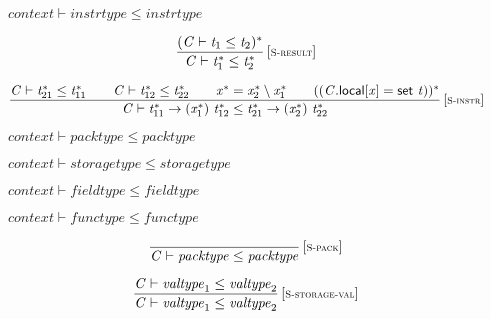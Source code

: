 $\boxed{{\mathit{context}} \vdash {\mathit{instrtype}} \leq {\mathit{instrtype}}}$

$$
\begin{array}{@{}c@{}}\displaystyle
\frac{
({\mathit{C}} \vdash {\mathit{t}}_{{1}} \leq {\mathit{t}}_{{2}})^\ast
}{
{\mathit{C}} \vdash {{\mathit{t}}_{{1}}^\ast} \leq {{\mathit{t}}_{{2}}^\ast}
} \, {[\textsc{\scriptsize S{-}result}]}
\qquad
\end{array}
$$

$$
\begin{array}{@{}c@{}}\displaystyle
\frac{
{\mathit{C}} \vdash {{\mathit{t}}_{{21}}^\ast} \leq {{\mathit{t}}_{{11}}^\ast}
 \qquad
{\mathit{C}} \vdash {{\mathit{t}}_{{12}}^\ast} \leq {{\mathit{t}}_{{22}}^\ast}
 \qquad
{{\mathit{x}}^\ast} = {{\mathit{x}}_{{2}}^\ast} \setminus {{\mathit{x}}_{{1}}^\ast}
 \qquad
(({\mathit{C}}.\mathsf{local}{}[{\mathit{x}}] = \mathsf{set}~{\mathit{t}}))^\ast
}{
{\mathit{C}} \vdash {{\mathit{t}}_{{11}}^\ast} \rightarrow ({{\mathit{x}}_{{1}}^\ast})~{{\mathit{t}}_{{12}}^\ast} \leq {{\mathit{t}}_{{21}}^\ast} \rightarrow ({{\mathit{x}}_{{2}}^\ast})~{{\mathit{t}}_{{22}}^\ast}
} \, {[\textsc{\scriptsize S{-}instr}]}
\qquad
\end{array}
$$

\vspace{1ex}

$\boxed{{\mathit{context}} \vdash {\mathit{packtype}} \leq {\mathit{packtype}}}$

$\boxed{{\mathit{context}} \vdash {\mathit{storagetype}} \leq {\mathit{storagetype}}}$

$\boxed{{\mathit{context}} \vdash {\mathit{fieldtype}} \leq {\mathit{fieldtype}}}$

$\boxed{{\mathit{context}} \vdash {\mathit{functype}} \leq {\mathit{functype}}}$

$$
\begin{array}{@{}c@{}}\displaystyle
\frac{
}{
{\mathit{C}} \vdash {\mathit{packtype}} \leq {\mathit{packtype}}
} \, {[\textsc{\scriptsize S{-}pack}]}
\qquad
\end{array}
$$

\vspace{1ex}

$$
\begin{array}{@{}c@{}}\displaystyle
\frac{
{\mathit{C}} \vdash {\mathit{valtype}}_{{1}} \leq {\mathit{valtype}}_{{2}}
}{
{\mathit{C}} \vdash {\mathit{valtype}}_{{1}} \leq {\mathit{valtype}}_{{2}}
} \, {[\textsc{\scriptsize S{-}storage{-}val}]}
\qquad
\end{array}
$$

